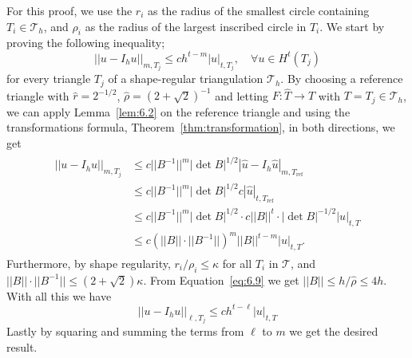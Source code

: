 \begin{bev}
    For this proof, we use the $r_i$ as the radius of the smallest circle containing $T_i\in \mathcal{T}_h$, 
    and $\rho_i$ as the radius of the largest inscribed circle in $T_i$.
    We start by proving the following inequality;
    \begin{equation}
        ||u-I_h u||_{m,T_j} \leq c h^{t-m} |u|_{t,T_j}, \quad \forall u \in H^t(T_j)
    \end{equation}
    for every triangle $T_j$ of a shape-regular triangulation $\mathcal{T}_h$. 
    By choosing a reference triangle with $\hat{r} = 2^{-1/2}$, $\hat{\rho} = {(2+\sqrt{2})}^{-1}$ and letting $F : \hat{T} \to T$ with $T = T_j \in \mathcal{T}_h$, 
    we can apply Lemma~\ref{lem:6.2} on the reference triangle and using the transformations formula, Theorem~\ref{thm:transformation}, in both directions, we get
    \begin{align}
        \begin{split}
        ||u-I_h u||_{m,T_j} &\leq c ||B^{-1}||^m |\det B |^{1/2} |\hat{u} - I_h \hat{u}|_{m,T_{\text{ref}}} \\
                            &\leq c ||B^{-1}||^m |\det B |^{1/2} c | \hat{u} |_{t,T_{\text{ref}}} \\
                            &\leq c ||B^{-1}||^m |\det B |^{1/2} \cdot c ||B||^t \cdot |\det B |^{-1/2} |u|_{t,T}  \\
                         &\leq c {\left( ||B||  \cdot ||B^{-1}|| \right)}^m ||B||^{t-m} |u|_{t,T}.
        \end{split}
    \end{align}
    Furthermore, by shape regularity, $r_i / \rho_i \leq \kappa$ for all $T_i$ in $\mathcal{T}$, and $||B|| \cdot ||B^{-1}|| \leq \left( 2 + \sqrt{2} \right)\kappa$. 
    From Equation~\eqref{eq:6.9} we get $||B|| \leq h/\hat{\rho}\leq 4h$.
    With all this we have
    \begin{equation}
        ||u-I_h u||_{\ell,T_j} \leq c h^{t-\ell} |u|_{t,T}
    \end{equation}
    Lastly by squaring and summing the terms from $\ell$ to $m$ we get the desired result.
\end{bev}
